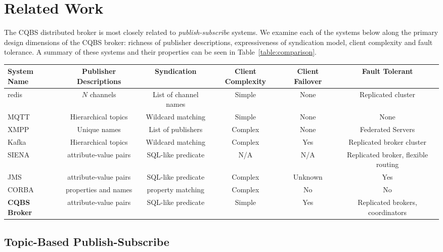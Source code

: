\section{Related Work}
\label{section:relatedwork}

The CQBS distributed broker is most closely related to \emph{publish-subscribe} systems.
We examine each of the systems below along the primary design dimensions of the CQBS broker: richness of publisher descriptions, expressiveness of syndication model, client complexity and fault tolerance.
A summary of these systems and their properties can be seen in Table~\ref{table:comparison}.

\begin{table*}[h]
\caption{High-level comparison of features between systems}
\label{table:comparison}
\centering
\begin{tabular}{|l|c|c|c|c|c|}
\hline
\textbf{System Name} & \textbf{Publisher Descriptions} & \textbf{Syndication} & \textbf{Client Complexity} & \textbf{Client Failover} & \textbf{Fault Tolerant} \\
\hline \hline
redis~\cite{redis} & $N$ channels & List of channel names & Simple & None & Replicated cluster \\
MQTT~\cite{locke2010mq}\cite{hunkeler2008mqtt} & Hierarchical topics & Wildcard matching & Simple & None & None \\
XMPP~\cite{saint2011extensible} & Unique names & List of publishers & Complex & None & Federated Servers \\
Kafka~\cite{kreps2011kafka} & Hierarchical topics & Wildcard matching & Complex & Yes & Replicated broker cluster \\
SIENA~\cite{carzaniga2000achieving} & attribute-value pairs & SQL-like predicate & N/A & N/A & Replicated broker, flexible routing \\
JMS~\cite{hapner2002java} & attribute-value pairs & SQL-like predicate & Complex & Unknown & Yes \\
CORBA~\cite{vinoski1997corba} & properties and names & property matching & Complex & No & No \\
\textbf{CQBS Broker} & attribute-value pairs & SQL-like predicate & Simple & Yes & Replicated brokers, coordinators \\
\hline
\end{tabular}
\end{table*}

\subsection{Topic-Based Publish-Subscribe}


